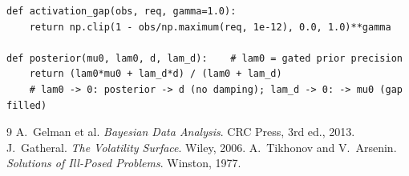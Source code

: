 \documentclass[11pt]{article}
\begin{document}
\begin{lstlisting}[caption={The gate (verbatim vs \texttt{calib/precision.py})
and the scalar posterior a gated row implements.}]
def activation_gap(obs, req, gamma=1.0):
    return np.clip(1 - obs/np.maximum(req, 1e-12), 0.0, 1.0)**gamma

def posterior(mu0, lam0, d, lam_d):    # lam0 = gated prior precision
    return (lam0*mu0 + lam_d*d) / (lam0 + lam_d)
    # lam0 -> 0: posterior -> d (no damping); lam_d -> 0: -> mu0 (gap filled)
\end{lstlisting}

\begin{thebibliography}{9}
 A.~Gelman et al. \emph{Bayesian Data Analysis}. CRC
Press, 3rd ed., 2013.
 J.~Gatheral. \emph{The Volatility Surface}. Wiley,
2006.
 A.~Tikhonov and V.~Arsenin. \emph{Solutions of
Ill-Posed Problems}. Winston, 1977.
\end{thebibliography}
\end{document}
